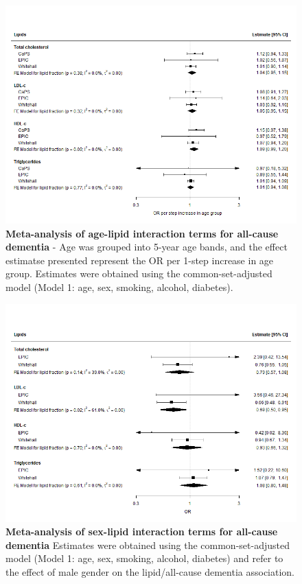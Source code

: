 \documentclass[a4paper, twoside]{templates/ociamthesis}
\begin{document}
\begin{figure}[H]
\includegraphics[width=1\linewidth]{figures/ipd/interaction_age_dementia} \caption[Meta-analysis of age-lipid interaction terms for all-cause dementia]{\textbf{Meta-analysis of age-lipid interaction terms for all-cause dementia} - Age was grouped into 5-year age bands, and the effect estimatse presented represent the OR per 1-step increase in age group. Estimates were obtained using the common-set-adjusted model (Model 1: age, sex, smoking, alcohol, diabetes).}\label{fig:interactionDementiaAge}
\end{figure}





\begin{figure}[H]
\includegraphics[width=1\linewidth]{figures/ipd/interaction_sex_dementia} \caption[Meta-analysis of sex-lipid interaction terms for all-cause dementia]{\textbf{Meta-analysis of sex-lipid interaction terms for all-cause dementia} Estimates were obtained using the common-set-adjusted model (Model 1: age, sex, smoking, alcohol, diabetes) and refer to the effect of male gender on the lipid/all-cause dementia association.}\label{fig:interactionDementiaSex}
\end{figure}
\end{document}
